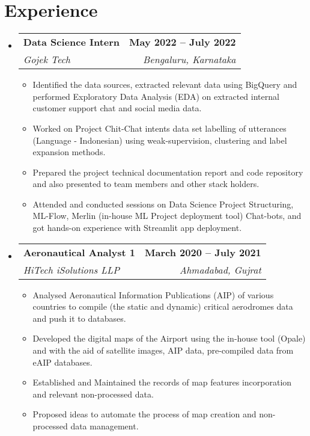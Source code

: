 \documentclass[letterpaper,11pt]{article}
\makeatletter
\newcommand{\resumeItem}[1]{
  \item\small{
    {#1 \vspace{-2pt}}
  }
}
\newcommand{\resumeSubheading}[4]{
  \vspace{-2pt}\item
    \begin{tabular*}{1.0\textwidth}[t]{l@{\extracolsep{\fill}}r}
      \textbf{#1} & \textbf{\small #2} \\
      \textit{\small#3} & \textit{\small #4} \\
    \end{tabular*}\vspace{-7pt}
}
\newcommand{\resumeSubHeadingListStart}{\begin{itemize}[leftmargin=0.0in, label={}]}
\newcommand{\resumeSubHeadingListEnd}{\end{itemize}}
\newcommand{\resumeItemListStart}{\begin{itemize}}
\newcommand{\resumeItemListEnd}{\end{itemize}\vspace{-5pt}}
\makeatother
\begin{document}
\section{Experience}
  \resumeSubHeadingListStart
  
    \resumeSubheading
        {Data Science Intern}{May 2022 -- July 2022}
        {Gojek Tech}{Bengaluru, Karnataka}
        \resumeItemListStart
            \resumeItem{Identified the data sources, extracted relevant data using BigQuery and performed Exploratory Data Analysis (EDA) on extracted internal customer support chat and social media data.}
            \resumeItem{Worked on Project Chit-Chat intents data set labelling of utterances (Language - Indonesian) using weak-supervision, clustering and label expansion methods.}
            \resumeItem{Prepared the project technical documentation report and code repository and also presented to team members and other stack holders.}
            \resumeItem{Attended and conducted sessions on Data Science Project Structuring, ML-Flow, Merlin (in-house ML Project deployment tool) Chat-bots, and got hands-on experience with Streamlit app deployment.}
        \resumeItemListEnd
 \resumeSubHeadingListEnd
 
 \resumeSubHeadingListStart
    \resumeSubheading
      {Aeronautical Analyst 1}{March 2020 -- July 2021}
      {HiTech iSolutions LLP}{Ahmadabad, Gujrat}
      \resumeItemListStart
        \resumeItem{Analysed Aeronautical Information Publications (AIP) of various countries to compile (the static and dynamic) critical aerodromes data and push it to databases.}
        \resumeItem{Developed the digital maps of the Airport using the in-house tool (Opale) and with the aid of satellite images, AIP data, pre-compiled data from eAIP databases.}
        \resumeItem{Established and Maintained the records of map features incorporation and relevant non-processed data.}
        \resumeItem{Proposed ideas to automate the process of map creation and non-processed data management.}
      \resumeItemListEnd
    
  \resumeSubHeadingListEnd
\vspace{-16pt}

\end{document}
